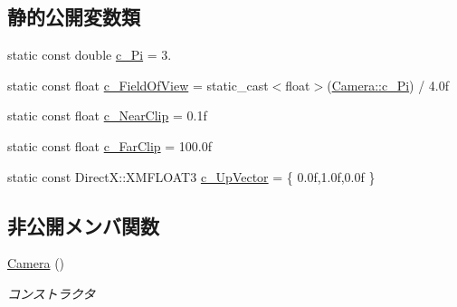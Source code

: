 \subsection*{静的公開変数類}
\begin{DoxyCompactItemize}
\item 
static const double \hyperlink{class_camera_a54764981cc23a98b371bc5fc12d4e50e}{c\+\_\+\+Pi} = 3.
\item 
static const float \hyperlink{class_camera_a51712c894e0df64215aae12dc97985d3}{c\+\_\+\+Field\+Of\+View} = static\+\_\+cast$<$float$>$(\hyperlink{class_camera_a54764981cc23a98b371bc5fc12d4e50e}{Camera\+::c\+\_\+\+Pi}) / 4.\+0f
\item 
static const float \hyperlink{class_camera_aa6af11ef8a84601a16811a8ef6d60fb1}{c\+\_\+\+Near\+Clip} = 0.\+1f
\item 
static const float \hyperlink{class_camera_aa5db6879f82c2538b7bfa2ae6b9e5656}{c\+\_\+\+Far\+Clip} = 100.\+0f
\item 
static const Direct\+X\+::\+X\+M\+F\+L\+O\+A\+T3 \hyperlink{class_camera_adf00fed6aca14c9362356375d267251b}{c\+\_\+\+Up\+Vector} = \{ 0.\+0f,1.\+0f,0.\+0f \}
\end{DoxyCompactItemize}
\subsection*{非公開メンバ関数}
\begin{DoxyCompactItemize}
\item 
\hyperlink{class_camera_aa3f3efcb2fcc75de885df29041103cd2}{Camera} ()
\begin{DoxyCompactList}\small\item\em コンストラクタ \end{DoxyCompactList}\end{DoxyCompactItemize}
